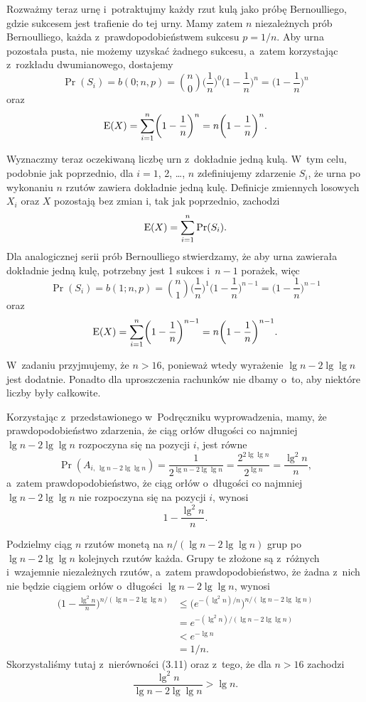Rozważmy teraz  urnę i~potraktujmy każdy rzut kulą jako próbę Bernoulliego, gdzie sukcesem jest trafienie do tej urny.
Mamy zatem $n$ niezależnych prób Bernoulliego, każda z~prawdopodobieństwem sukcesu $p=1/n$.
Aby  urna pozostała pusta, nie możemy uzyskać żadnego sukcesu, a~zatem korzystając z~rozkładu dwumianowego, dostajemy
\[
	\Pr(S_i) = b(0;n,p) = \binom{n}{0}\biggl(\frac{1}{n}\biggr)^0\biggl(1-\frac{1}{n}\biggr)^n = \biggl(1-\frac{1}{n}\biggr)^n
\]
oraz
\[
	\operatorname{E}(X) = \sum_{i=1}^n\biggl(1-\frac{1}{n}\biggr)^n = n\biggl(1-\frac{1}{n}\biggr)^n.
\]

Wyznaczmy teraz oczekiwaną liczbę urn z~dokładnie jedną kulą.
W~tym celu, podobnie jak poprzednio, dla $i=1$, 2, \dots, $n$ zdefiniujemy zdarzenie $S_i$, że  urna po wykonaniu $n$ rzutów zawiera dokładnie jedną kulę.
Definicje zmiennych losowych $X_i$ oraz $X$ pozostają bez zmian i, tak jak poprzednio, zachodzi
\[
	\operatorname{E}(X) = \sum_{i=1}^n\Pr(S_i).
\]
Dla analogicznej serii prób Bernoulliego stwierdzamy, że aby  urna zawierała dokładnie jedną kulę, potrzebny jest 1 sukces i~$n-1$ porażek, więc
\[
	\Pr(S_i) = b(1;n,p) = \binom{n}{1}\biggl(\frac{1}{n}\biggr)^1\biggl(1-\frac{1}{n}\biggr)^{n-1} = \biggl(1-\frac{1}{n}\biggr)^{n-1}
\]
oraz
\[
	\operatorname{E}(X) = \sum_{i=1}^n\biggl(1-\frac{1}{n}\biggr)^{n-1} = n\biggl(1-\frac{1}{n}\biggr)^{n-1}.
\]

\exercise %
W~zadaniu przyjmujemy, że $n>16$, ponieważ wtedy wyrażenie $\lg n-2\lg\lg n$ jest dodatnie.
Ponadto dla uproszczenia rachunków nie dbamy o~to, aby niektóre liczby były całkowite.

Korzystając z~przedstawionego w~Podręczniku wyprowadzenia, mamy, że prawdopodobieństwo zdarzenia, że ciąg orłów długości co najmniej $\lg n-2\lg\lg n$ rozpoczyna się na pozycji $i$, jest równe
\[
	\Pr(A_{i,\,\lg n-2\lg\lg n}) = \frac{1}{2^{\lg n-2\lg\lg n}} = \frac{2^{2\lg\lg n}}{2^{\lg n}} = \frac{\lg^2n}{n},
\]
a~zatem prawdopodobieństwo, że ciąg orłów o~długości co najmniej $\lg n-2\lg\lg n$ nie rozpoczyna się na pozycji $i$, wynosi
\[
	1-\frac{\lg^2n}{n}.
\]

Podzielmy ciąg $n$ rzutów monetą na $n/(\lg n-2\lg\lg n)$ grup po $\lg n-2\lg\lg n$ kolejnych rzutów każda.
Grupy te złożone są z~różnych i~wzajemnie niezależnych rzutów, a~zatem prawdopodobieństwo, że żadna z~nich nie będzie ciągiem orłów o~długości $\lg n-2\lg\lg n$, wynosi
\begin{align*}
	\biggl(1-\frac{\lg^2n}{n}\biggr)^{n/(\lg n-2\lg\lg n)} &\le \bigl(e^{-(\lg^2n)/n}\bigr)^{n/(\lg n-2\lg\lg n)} \\
	&= e^{-(\lg^2n)/(\lg n-2\lg\lg n)} \\
	&< e^{-\lg n} \\
	&= 1/n.
\end{align*}
Skorzystaliśmy tutaj z~nierówności (3.11) oraz z~tego, że dla $n>16$ zachodzi
\[
	\frac{\lg^2n}{\lg n-2\lg\lg n} > \lg n.
\]

